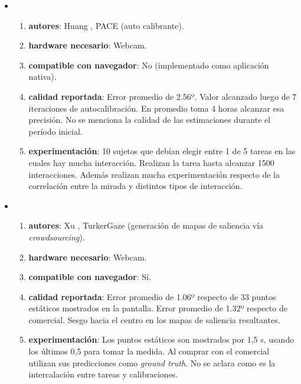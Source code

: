 \begin{itemize}
  \item \begin{enumerate}
    \item \textbf{autores}:
      Huang \etal, PACE \cite{huang_2016_pace} (\eyetracking auto
      calibrante).
    \item \textbf{hardware necesario}:
      Webcam.
    \item \textbf{compatible con navegador}:
      No (implementado como aplicación nativa).
    \item \textbf{calidad reportada}:
      Error promedio de 2.56º.
      Valor alcanzado luego de 7 iteraciones de autocalibración.
      En promedio toma 4 horas alcanzar esa precisión.
      No se menciona la calidad de las estimaciones durante el período inicial.
    \item \textbf{experimentación}:
      10 sujetos que debían elegir entre 1 de 5 tareas en las cuales hay mucha
      interacción.
      Realizan la tarea hasta alcanzar 1500 interacciones.
      Además realizan mucha experimentación respecto de la correlación entre la
      mirada y distintos tipos de interacción.
  \end{enumerate}

  \item \begin{enumerate}
    \item \textbf{autores}:
      Xu \etal, TurkerGaze \cite{xu_2015_turker_gaze} (generación de mapas de
      saliencia vía \textit{crowdsourcing}).
    \item \textbf{hardware necesario}:
      Webcam.
    \item \textbf{compatible con navegador}:
      Sí.
    \item \textbf{calidad reportada}:
      Error promedio de 1.06º respecto de 33 puntos estáticos mostrados en la
      pantalla.
      Error promedio de 1.32º respecto de \eyetracker comercial.
      Sesgo hacia el centro en los mapas de saliencia resultantes.
    \item \textbf{experimentación}:
      Los puntos estáticos son mostrados por 1,5 s, usando los últimos 0,5 para
      tomar la medida.
      Al comprar con el \eyetracker comercial utilizan sus predicciones como
      \textit{ground truth}.
      No se aclara como es la intercalación entre tareas y calibraciones.
  \end{enumerate}


\end{itemize}
